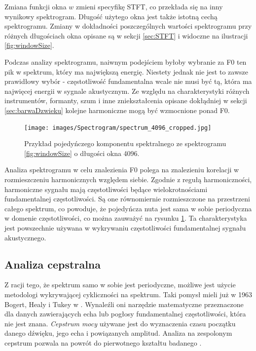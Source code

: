 \documentclass[12pt,a4paper,twoside]{mwart}
\begin{document}
Zmiana funkcji okna $w$ zmieni specyfikę STFT, co przekłada się na inny wynikowy spektrogram. Długość użytego okna jest także istotną cechą spektrogramu. Zmiany w dokładności poszczególnych wartości spektrogramu przy różnych długościach okna opisane są w sekcji \ref{sec:STFT} i widoczne na ilustracji \ref{fig:windowSize}.

Podczas analizy spektrogramu, naiwnym podejściem byłoby wybranie za F0 ten pik w spektrum, który ma największą energię. Niestety jednak nie jest to zawsze prawidłowy wybór - częstotliwość fundamentalna wcale nie musi być tą, która ma najwięcej energii w sygnale akustycznym. Ze względu na charakterystyki różnych instrumentów, formanty, szum i inne zniekształcenia opisane dokłądniej w sekcji \ref{sec:barwaDzwieku} kolejne harmoniczne mogą być wzmocnione ponad F0.

\begin{figure}[t]
  \begin{center}
    \texttt{[image: images/Spectrogram/spectrum\_4096\_cropped.jpg]}
    \caption{Przykład pojedyńczego komponentu spektralnego ze spektrogramu \ref{fig:windowSize} o długości okna 4096.}
    \label{fig:spectralComponent}
  \end{center}
\end{figure}

Analiza spektrogramu w celu znalezienia F0 polega na znalezieniu korelacji w rozmieszczeniu harmonicznych względem siebie. Zgodnie z regułą harmoniczności, harmoniczne sygnału mają częstotliwości będące wielokrotnościami fundamentalnej częstotliwości. Są one równomiernie rozmieszczone na przestrzeni całego spektrum, co powoduje, że pojedyńcza nuta jest sama w sobie periodyczna w domenie częstotliwości, co można zauważyć na rysunku \ref{fig:spectralComponent}. Ta charakterystyka jest powszechnie używana w wykrywaniu częstotliwości fundamentalnej sygnału akustycznego.

\subsection{Analiza cepstralna}\label{sec:f0:ceps}
Z racji tego, że spektrum samo w sobie jest periodyczne, możliwe jest użycie metodologi wykrywającej cykliczności na spektrum. Taki pomysł mieli już w 1963 Bogert, Healy i Tukey w \cite{Transcription:Bogert:FirstCepstrum}. Wynaleźli oni narzędzie matematyczne przeznaczone dla danych zawierających echa lub pogłosy fundamentalnej częstotliwości, która nie jest znana. \textit{Cepstrum mocy} używane jest do wyznaczenia czasu początku danego dźwięku, jego echa i powiązanych amplitud. Analiza na zespolonym cepstrum pozwala na powrót do pierwotnego kształtu badanego \cite{Transcription:Childers:CepstruGuide} 
\cite[46-50]{Transcription:Quenneville:Thesis}
.
\end{document}
